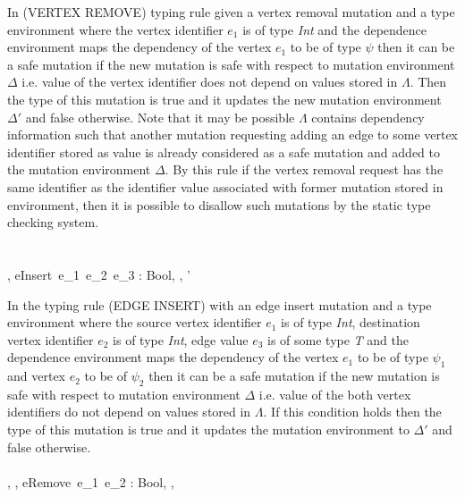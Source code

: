 \smallskip

In (VERTEX REMOVE) typing rule given a vertex removal mutation and a type environment where the vertex identifier $e_1$ is of type \emph{Int} and the dependence environment maps the dependency of the vertex $e_1$ to be of type $\psi$ then it can be a safe mutation if the new mutation is safe with respect to mutation environment $\Delta$ i.e. value of the vertex identifier does not depend on values stored in $\Lambda$. Then the type of this mutation is true and it updates the new mutation environment $\Delta'$ and false otherwise. Note that it may be possible $\Lambda$ contains dependency information such that another mutation requesting adding an edge to some vertex identifier stored as value is already considered as a safe mutation and added to the mutation environment $\Delta$. By this rule if the vertex removal request has the same identifier as the identifier value associated with former mutation stored in environment, then it is possible to disallow such mutations by the static type checking system.\\    
\ \\
\ \\         
    {\Gamma, \Lambda \Delta \vdash eInsert\ e_1\ e_2\ e_3 : Bool, \Lambda, \Delta'}

\smallskip

In the typing rule (EDGE INSERT) with an edge insert mutation and a type environment where the source vertex identifier $e_1$ is of type \emph{Int}, destination vertex identifier $e_2$ is of type \emph{Int}, edge value $e_3$ is of some type \emph{T} and the dependence environment maps the dependency of the vertex $e_1$ to be of type $\psi_1$ and vertex $e_2$ to be of $\psi_2$ then it can be a safe mutation if the new mutation is safe with respect to mutation environment $\Delta$ i.e. value of the both vertex identifiers do not depend on values stored in $\Lambda$. If this condition holds then the type of this mutation is true and it updates the mutation environment to $\Delta'$ and false otherwise.   
\ \\
\ \\ 
    {\Gamma, \Lambda, \Delta \vdash eRemove\ e_1\ e_2 : Bool, \Lambda, \Delta}

